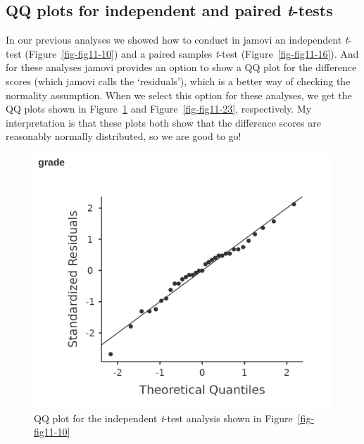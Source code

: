 \documentclass[
  a4paper,
]{book}
\begin{document}
\hypertarget{qq-plots-for-independent-and-paired-t-tests}{%
\subsection{\texorpdfstring{QQ plots for independent and paired
\emph{t}-tests}{QQ plots for independent and paired t-tests}}\label{qq-plots-for-independent-and-paired-t-tests}}

In our previous analyses we showed how to conduct in jamovi an
independent \emph{t}-test (Figure~\ref{fig-fig11-10}) and a paired
samples \emph{t}-test (Figure~\ref{fig-fig11-16}). And for these
analyses jamovi provides an option to show a QQ plot for the difference
scores (which jamovi calls the `residuals'), which is a better way of
checking the normality assumption. When we select this option for these
analyses, we get the QQ plots shown in Figure~\ref{fig-fig11-22} and
Figure~\ref{fig-fig11-23}, respectively. My interpretation is that these
plots both show that the difference scores are reasonably normally
distributed, so we are good to go!

\begin{figure}

\includegraphics[width=1\textwidth,height=\textheight]{images/fig11-22.png} \hfill{}

\caption{\label{fig-fig11-22}QQ plot for the independent \emph{t}-test
analysis shown in Figure~\ref{fig-fig11-10}}

\end{figure}
\end{document}
